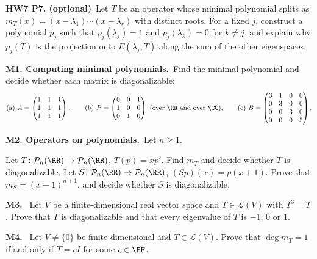 \documentclass[10pt]{scrartcl}
\newcommand{\LL}{\mathcal L}\newcommand{\PP}{\mathcal P}\newcommand{\MM}{\mathcal M}
\begin{document}
\begin{prob}
\textbf{HW7 P7. (optional)}\ Let $T$ be an operator whose minimal polynomial splits as $m_T(x)=(x-\lambda_1)\cdots(x-\lambda_r)$ with distinct roots. For a fixed $j$, construct a polynomial $p_j$ such that $p_j(\lambda_j)=1$ and $p_j(\lambda_k)=0$ for $k\ne j$, and explain why $p_j(T)$ is the projection onto $E(\lambda_j,T)$ along the sum of the other eigenspaces.

\end{prob}

\begin{prob}
\textbf{M1. Computing minimal polynomials.}\ Find the minimal polynomial and decide whether each matrix is diagonalizable:
\[
  \text{(a) } A=\begin{pmatrix}1&1&1\\1&1&1\\1&1&1\end{pmatrix}, \qquad
  \text{(b) } P=\begin{pmatrix}0&0&1\\1&0&0\\0&1&0\end{pmatrix} \text{ (over $\RR$ and over $\CC$)}, \qquad
  \text{(c) } B=\begin{pmatrix}3&1&0&0\\0&3&0&0\\0&0&3&0\\0&0&0&5\end{pmatrix}.
\]
\end{prob}

\begin{prob}
\textbf{M2. Operators on polynomials.}\ Let $n\ge1$.
\begin{enumerate}[(a)]
  \ii Let $T\colon\PP_n(\RR)\to\PP_n(\RR)$, $T(p)=xp'$. Find $m_T$ and decide whether $T$ is diagonalizable.
  \ii Let $S\colon\PP_n(\RR)\to\PP_n(\RR)$, $(Sp)(x)=p(x+1)$. Prove that $m_S=(x-1)^{n+1}$, and decide whether $S$ is diagonalizable.
\end{enumerate}
\end{prob}

\begin{prob}
\textbf{M3. }\ Let $V$ be a finite-dimensional real vector space and $T\in\LL(V)$ with $T^3=T$. Prove that $T$ is diagonalizable and that every eigenvalue of $T$ is $-1$, $0$ or $1$.
\end{prob}

\begin{prob}
\textbf{M4. }\ Let $V\ne\{0\}$ be finite-dimensional and $T\in\LL(V)$. Prove that $\deg m_T=1$ if and only if $T=cI$ for some $c\in\FF$.
\end{prob}
\end{document}
